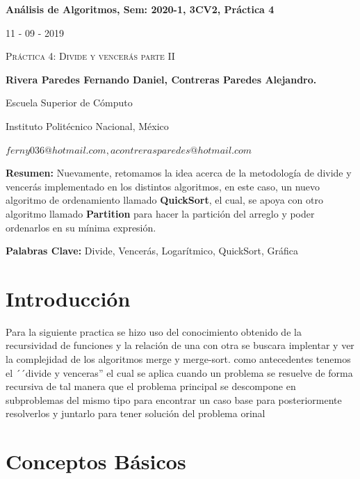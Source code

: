 \documentclass[12pt,twoside]{article}
\begin{document}
\centerline{\bf An\'alisis de Algoritmos, Sem: 2020-1, 3CV2, Pr\'actica 4}
\centerline{}
\centerline{11 - 09 - 2019}
\begin{center}
\Large{\textsc{Pr\'actica 4: Divide y vencerás parte II}}
\end{center}
\centerline{}
\centerline{\bf {Rivera Paredes Fernando Daniel, Contreras Paredes Alejandro.}}
\centerline{}
\centerline{Escuela Superior de C\'omputo}
\centerline{Instituto Polit\'ecnico Nacional, M\'exico}
\centerline{$ferny036@hotmail.com, acontrerasparedes@hotmail.com$}
\newtheorem{Theorem}{\quad Theorem}[section] \newtheorem{Definition}[Theorem]{\quad Definition} \newtheorem{Corollary}[Theorem]{\quad Corollary} \newtheorem{Lemma}[Theorem]{\quad Lemma} \newtheorem{Example}[Theorem]{\quad Example} \bigskip
\textbf{Resumen:} Nuevamente, retomamos la idea acerca de la metodología de divide y vencerás implementado en los distintos algoritmos, en este caso, un nuevo algoritmo de 
ordenamiento llamado \textbf{QuickSort}, el cual, se apoya con otro algoritmo llamado \textbf{Partition} para hacer la partición del arreglo y poder ordenarlos en su mínima expresión.

\centerline{}
{\bf Palabras Clave:} Divide, Vencerás, Logarítmico, QuickSort, Gráfica
\newpage

\section{Introducción}
Para la siguiente practica se hizo uso del conocimiento obtenido de la recursividad de funciones y la relaci\'on de una con otra se buscara implentar y ver la complejidad 
de los algoritmos merge y merge-sort. como antecedentes tenemos el ´´divide y venceras'' el cual se aplica cuando un problema se resuelve de forma recursiva
de tal manera que el problema principal se descompone en subproblemas del mismo tipo para encontrar un caso base para posteriormente resolverlos y juntarlo para tener soluci\'on del problema orinal


\section{Conceptos B\'asicos} 
\end{document}
